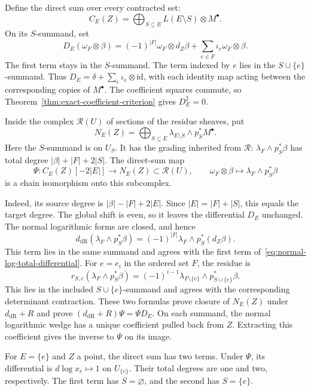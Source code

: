 Define the direct sum over every contracted set:
\[
C_E(Z)=\bigoplus_{S\subseteq E}L(E\setminus S)\otimes M^\bullet.
\]
On its $S$-summand, set
\begin{equation}
\label{eq:normal-log-total-differential}
D_E(\omega_F\otimes\beta)
=(-1)^{|F|}\omega_F\otimes d_Z\beta
+\sum_{e\in F}\iota_e\omega_F\otimes\beta.
\end{equation}
The first term stays in the $S$-summand.
The term indexed by $e$ lies in the $S\cup\{e\}$-summand.
Thus $D_E=\delta+\sum_e\iota_e\otimes\mathrm{id}$, with each identity map acting between the corresponding copies of $M^\bullet$.
The coefficient squares commute, so Theorem~\ref{thm:exact-coefficient-criterion} gives $D_E^2=0$.

Inside the complex $\mathcal R(U)$ of sections of the residue sheaves, put
\[
N_E(Z)=\bigoplus_{S\subseteq E}
\lambda_{E\setminus S}\wedge p_S^*M^\bullet.
\]
Here the $S$-summand is on $U_S$.
It has the grading inherited from $\mathcal R$:
$\lambda_F\wedge p_S^*\beta$ has total degree $|\beta|+|F|+2|S|$.
The direct-sum map
\begin{equation}
\label{eq:log-symbol-comparison}
\Psi:C_E(Z)[-2|E|]\longrightarrow N_E(Z)\subset\mathcal R(U),
\qquad
\omega_F\otimes\beta\longmapsto\lambda_F\wedge p_S^*\beta
\end{equation}
is a chain isomorphism onto this subcomplex.

Indeed, its source degree is $|\beta|-|F|+2|E|$.
Since $|E|=|F|+|S|$, this equals the target degree.
The global shift is even, so it leaves the differential $D_E$ unchanged.
The normal logarithmic forms are closed, and hence
\[
d_{\mathrm{dR}}(\lambda_F\wedge p_S^*\beta)
=(-1)^{|F|}\lambda_F\wedge p_S^*(d_Z\beta).
\]
This term lies in the same summand and agrees with the first term of~\eqref{eq:normal-log-total-differential}.
For $e=e_i$ in the ordered set $F$, the residue is
\[
r_{S,e}(\lambda_F\wedge p_S^*\beta)
=(-1)^{i-1}\lambda_{F\setminus\{e\}}\wedge p_{S\cup\{e\}}^*\beta.
\]
This lies in the included $S\cup\{e\}$-summand and agrees with the corresponding determinant contraction.
These two formulas prove closure of $N_E(Z)$ under $d_{\mathrm{dR}}+R$ and prove
$(d_{\mathrm{dR}}+R)\Psi=\Psi D_E$.
On each summand, the normal logarithmic wedge has a unique coefficient pulled back from $Z$.
Extracting this coefficient gives the inverse to $\Psi$ on its image.

For $E=\{e\}$ and $Z$ a point, the direct sum has two terms.
Under $\Psi$, its differential is $d\log x_e\mapsto1$ on $U_{\{e\}}$.
Their total degrees are one and two, respectively.
The first term has $S=\varnothing$, and the second has $S=\{e\}$.


